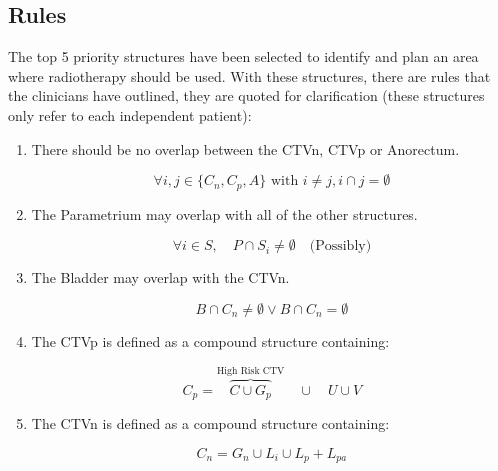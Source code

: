 \documentclass[11pt,twoside]{report}
\begin{document}
\subsection{Rules}

The top 5 priority structures have been selected to identify and plan an area where radiotherapy should be used. With these structures, there are rules that the clinicians have outlined, they are quoted for clarification (these structures only refer to each independent patient):

\begin{enumerate}
  \item There should be no overlap between the CTVn, CTVp or Anorectum.

        \begin{equation}
          \forall{i,j \in \{C_n, C_p, A\}}\text{ with } i \neq j, i \cap j = \emptyset
        \end{equation}

  \item The Parametrium may overlap with all of the other structures.

        \begin{equation}
          \forall i \in S, \quad P \cap S_i \neq \emptyset \quad \text{(Possibly)}
        \end{equation}

  \item The Bladder may overlap with the CTVn.

        \begin{equation}
          B \cap C_n \neq \emptyset \vee B \cap C_n = \emptyset\label{eq:ctvn}
        \end{equation}

  \item The CTVp is defined as a compound structure containing:

        \begin{equation}
          C_p = \overbrace{C \cup G_p}^{\text{High Risk CTV}} \quad \cup \quad U \cup V\label{eq:ctvp}
        \end{equation}

  \item The CTVn is defined as a compound structure containing:

        \begin{equation}
          C_n = G_n \cup L_i \cup L_p + L_{pa}
        \end{equation}

\end{enumerate}
\end{document}
